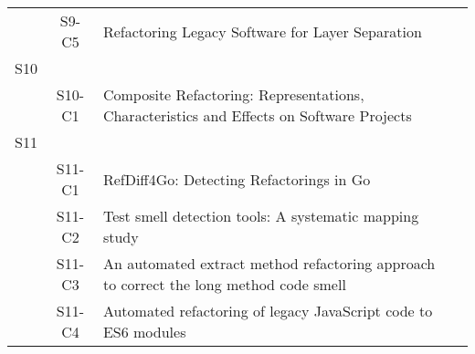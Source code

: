 \begin{longtable}{ccp{9cm}p{3cm}}
    & S9-C5   & Refactoring Legacy Software for Layer Separation                                                                                                                                                                                               & \citeauthor*{Khalilipour2021} \\
S10 &        &                                                                                                                                                                                                                                               &                                 \\
    & S10-C1  & Composite Refactoring: Representations, Characteristics and Effects on Software Projects                                                                                                                                                       & \citeauthor*{Bibiano2022}     \\
S11 &        &                                                                                                                                                                                                                                               &                                 \\
    & S11-C1  & RefDiff4Go: Detecting Refactorings in Go                                                                                                                                                                                                       & \citeauthor*{Brito2020}       \\
    & S11-C2  & Test smell detection tools: A systematic mapping study                                                                                                                                                                                         & \citeauthor*{Aljedaani2021}   \\
    & S11-C3  & An automated extract method refactoring approach to correct the long method code smell                                                                                                                                                         & \citeauthor*{Shahidi2022}     \\
    & S11-C4  & Automated refactoring of legacy JavaScript code to ES6 modules                                                                                                                                                                                 & \citeauthor*{Paltoglou2021}   \\

\end{longtable}
